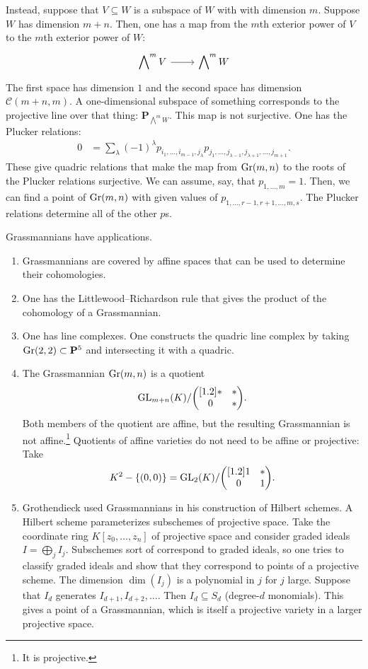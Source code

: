 \documentclass [11 pt, oneside] {article}
\begin{document}
Instead, suppose that $V\subseteq W$ is a subspace of $W$ with with dimension $m$. Suppose $W$ has dimension $m+n$. Then, one has a map from the $m$th exterior power of $V$ to the $m$th exterior power of $W$:
\[
\begin{tikzcd}
\displaystyle\bigwedge\nolimits^m V \ar[r]&  \displaystyle\bigwedge\nolimits ^m W
\end{tikzcd}
\]
The first space has dimension $1$ and the second space has dimension $\mathscr{C}({m+n},{m})$. A one-dimensional subspace of something corresponds to the projective line over that thing: $\mathbf{P}_{\bigwedge\nolimits^m W}$. This map is not surjective. 
One has the Plucker relations:
\begin{align*}
	0 &= \sum_{\lambda}^{} (-1)^\lambda p_{i_1,\hdots, i_{m-1},j_\lambda} p_{j_1,\hdots, j_{\lambda -1},j_{\lambda+1},\hdots, j_{m+1}}.
\end{align*}
These give quadric relations that make the map from $\operatorname{Gr}(m,n)$ to the roots of the Plucker relations surjective. We can assume, say, that $p_{1,\hdots, m} = 1$. Then, we can find a point of $\operatorname{Gr}(m,n)$ with given values of $p_{1,\hdots, r-1,r+1,\hdots, m,s}$. The Plucker relations determine all of the other $p$s.

Grassmannians have applications.
\begin{enumerate}
	\item Grassmannians are covered by affine spaces that can be used to determine their cohomologies.
	\item One has the Littlewood--Richardson rule that gives the product of the cohomology of a Grassmannian.
	\item One has line complexes. One constructs the quadric line complex by taking $\operatorname{Gr}(2,2)\subset  \mathbf{P}^5$ and intersecting it with a quadric.
	\item The Grassmannian $\operatorname{Gr}(m,n)$ is a quotient 
		\[
			{\operatorname{GL}_{m+n}(K)}/{\begin{pmatrix} [1.2] *&*\\0&*\end{pmatrix}}.
		\] 
		Both members of the quotient are affine, but the resulting Grassmannian is not affine.\footnote{It is projective.} Quotients of affine varieties do not need to be affine or projective: Take 
		\begin{align*}
			K^2 - \{(0,0)\} =  {\operatorname{GL}_{2}(K) }/{\begin{pmatrix} [1.2] 1&*\\0&1\end{pmatrix}}.
		\end{align*}
	\item Grothendieck used Grassmannians in his construction of Hilbert schemes. A Hilbert scheme parameterizes subschemes of projective space. Take the coordinate ring $K[z_0,\hdots, z_n]$ of projective space and consider graded ideals $I = \bigoplus_j I_j$. Subschemes sort of correspond to graded ideals, so one tries to classify graded ideals and show that they correspond to points of a projective scheme. The dimension $\dim (I_j)$ is a polynomial in $j$ for $j$ large. Suppose that $I_d$ generates $I_{d+1},I_{d+2},\hdots$. Then $I_d \subseteq S_d$ (degree-$d$ monomials). This gives a point of a Grassmannian, which is itself a projective variety in a larger projective space.
\end{enumerate}
\end{document}
